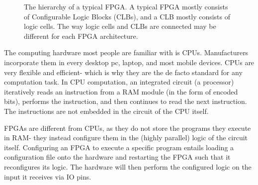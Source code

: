 \begin{figure}
\caption{The hierarchy of a typical FPGA. A typical FPGA mostly consists of Configurable Logic Blocks (CLBs), and a CLB mostly consists of logic cells. The way logic cells and CLBs are connected may be different for each FPGA architecture.}
\end{figure}


The computing hardware most people are familiar with is CPUs. Manufacturers incorporate them in every desktop pc, laptop, and most mobile devices. CPUs are very flexible and efficient- which is why they are the de facto standard for any computation task. In CPU computation, an integrated circuit (a processor) iteratively reads an instruction from a RAM module (in the form of encoded bits), performs the instruction, and then continues to read the next instruction. The instructions are not embedded in the circuit of the CPU itself.

FPGAs are different from CPUs, as they do not store the programs they execute in RAM- they instead configure them in the (highly parallel) logic of the circuit itself. Configuring an FPGA to execute a specific program entails loading a configuration file onto the hardware and restarting the FPGA such that it reconfigures its logic. The hardware will then perform the configured logic on the input it receives via IO pins. 

